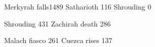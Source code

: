 \begin{comment}
\subsection{\SecondbanewarBook}
\end{comment}

              {Merkyrah falls}{1489}
               {Satharioth}    {116}
     {Shrouding}     {0}

\newcommand{\dateSecherdamonsVow} {%
  \typesetdraconianresphanvaimondate{Second Banewar ends}}



\begin{comment}
\subsection{\ResphanWarsBook}
\end{comment}

                {Shrouding}      {431}
                 {Zachirah death} {286}



\begin{comment}
\subsection{\TheLieSublimeBook}
\end{comment}

                  {Malach fiasco}       {261}
            {Cuezca rises}        {137}







\begin{comment}
\section{Archons of \Miith}
\end{comment}



\begin{comment}
\subsection{Cordos Vaimon's time}
\end{comment}

